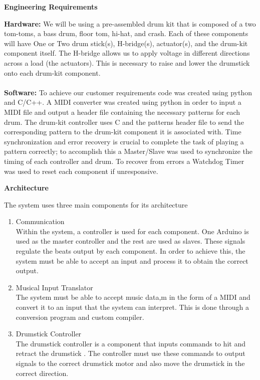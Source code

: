 \documentclass[]{report}
\begin{document}
\begin{center} \textbf{Engineering Requirements} \end{center}
\textbf{Hardware:} We will be using a pre-assembled drum kit that is composed of a two tom-toms, a bass drum, floor tom, hi-hat, and crash. Each of these components will have One or Two drum stick(s),  H-bridge(s), actuator(s), and the drum-kit component itself. The H-bridge allows us to apply voltage in different directions across a load (the actuators). This is necessary to raise and lower the drumstick onto each drum-kit component.\\\\
\textbf{Software:} To achieve our customer requirements code was created using python and C/C++. A MIDI converter was created using python in order to input a MIDI file and output a header file containing the necessary patterns for each drum. The drum-kit controller uses C and the patterns header file to send the corresponding pattern to the drum-kit component it is associated with. Time synchronization and error recovery is crucial to complete the task of playing a pattern correctly; to accomplish this a Master/Slave was used to synchronize the timing of each controller and drum. To recover from errors a Watchdog Timer was used to reset each component if unresponsive.
\begin{center} \textbf{Architecture} \end{center}
The system uses three main components for its architecture
	\begin{enumerate}
		\item Communication\\ Within the system, a	controller is used for each component. One Arduino is used as the master controller and the rest are used as slaves.	These signals regulate the beats output by each component. In order to achieve this, the system must be able to accept an input and process it to obtain the correct output.
		
		\item Musical Input Translator\\ The system must be able to accept music data,m in the form of a MIDI and convert it to an input that the system can interpret. This is done through a conversion program and custom compiler.
		\item Drumstick	Controller\\
		The	drumstick controller is	a component	that inputs commands to	hit	and	retract	the	drumstick . The controller must use these commands to output signals to the correct drumstick motor and also move the drumstick in the correct direction.
	\end{enumerate}
\end{document}
